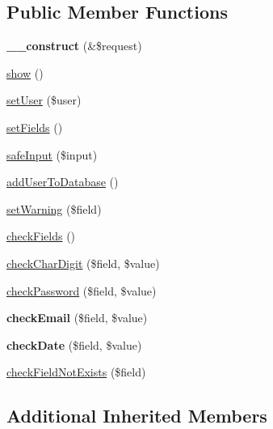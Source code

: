 \subsection*{Public Member Functions}
\begin{DoxyCompactItemize}
\item 
\hypertarget{classSignUpModel_aae52ec1db27fb922288ac520b878f26a}{{\bfseries \+\_\+\+\_\+construct} (\&\$request)}\label{classSignUpModel_aae52ec1db27fb922288ac520b878f26a}

\item 
\hyperlink{classSignUpModel_a3d80b2fd00a974e0887f595cc7965212}{show} ()
\item 
\hyperlink{classSignUpModel_acd59c8e245153cf560a31aaba4f64773}{set\+User} (\$user)
\item 
\hyperlink{classSignUpModel_adea2bbedb918ea9c7773afdbe364ebed}{set\+Fields} ()
\item 
\hyperlink{classSignUpModel_ad95d57f037ec90c73b9a94a51e1ef4c7}{safe\+Input} (\$input)
\item 
\hyperlink{classSignUpModel_a93f4575092488361fb4fd5f414ffdb48}{add\+User\+To\+Database} ()
\item 
\hyperlink{classSignUpModel_a3c4428291475bd3312836fa81f1a75c7}{set\+Warning} (\$field)
\item 
\hyperlink{classSignUpModel_a1e62f6ed2749da2c1330748adb9afb03}{check\+Fields} ()
\item 
\hyperlink{classSignUpModel_a9143bf2de7d986b7a87835a305fead69}{check\+Char\+Digit} (\$field, \$value)
\item 
\hyperlink{classSignUpModel_afb9cdf85f663e052513dba210c4c42a3}{check\+Password} (\$field, \$value)
\item 
\hypertarget{classSignUpModel_ac2454823e6ba92643040f0949ea00d7a}{{\bfseries check\+Email} (\$field, \$value)}\label{classSignUpModel_ac2454823e6ba92643040f0949ea00d7a}

\item 
\hypertarget{classSignUpModel_a0db60aa03b0f53ae8d8ba41f90117d7a}{{\bfseries check\+Date} (\$field, \$value)}\label{classSignUpModel_a0db60aa03b0f53ae8d8ba41f90117d7a}

\item 
\hyperlink{classSignUpModel_a56bbe709052d4774939c95080251a20f}{check\+Field\+Not\+Exists} (\$field)
\end{DoxyCompactItemize}
\subsection*{Additional Inherited Members}


